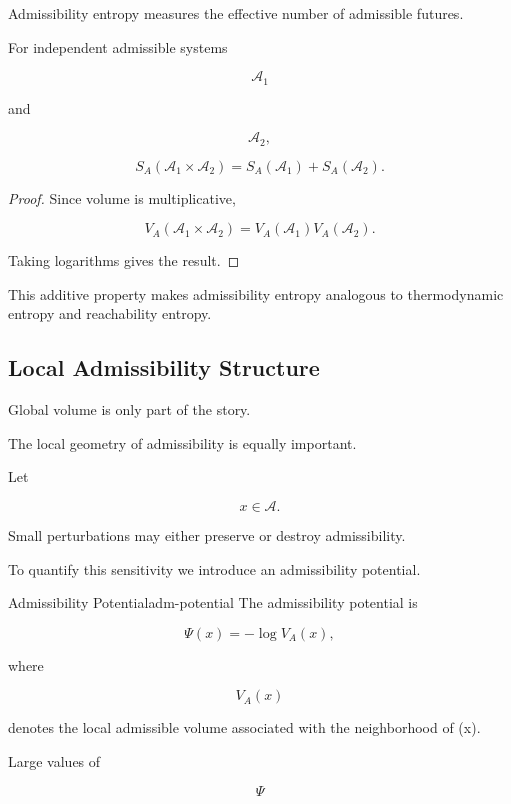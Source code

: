 \documentclass[12pt,twoside,openright]{book}
\newenvironment{prop}
{\begin{proposition}{}{}}
{\end{proposition}}
\begin{document}
Admissibility entropy measures the effective number of
admissible futures.

\begin{prop}
For independent admissible systems

\[
\mathcal A_1
\]

and

\[
\mathcal A_2,
\]

\[
S_A(\mathcal A_1\times\mathcal A_2)
=

S_A(\mathcal A_1)
+
S_A(\mathcal A_2).
\]
\end{prop}

\begin{proof}
Since volume is multiplicative,

\[
V_A(\mathcal A_1\times\mathcal A_2)
=

V_A(\mathcal A_1)
V_A(\mathcal A_2).
\]

Taking logarithms gives the result.
\end{proof}

This additive property makes admissibility entropy
analogous to thermodynamic entropy and reachability
entropy.

\subsection{Local Admissibility Structure}

Global volume is only part of the story.

The local geometry of admissibility is equally important.

Let

\[
x\in\mathcal A.
\]

Small perturbations may either preserve or destroy
admissibility.

To quantify this sensitivity we introduce an
admissibility potential.

\begin{definition}{Admissibility Potential}{adm-potential}
The admissibility potential is

\[
\Psi(x)
=

-\log V_A(x),
\]

where

\[
V_A(x)
\]

denotes the local admissible volume associated with the
neighborhood of (x).
\end{definition}

Large values of

\[
\Psi
\]
\end{document}

